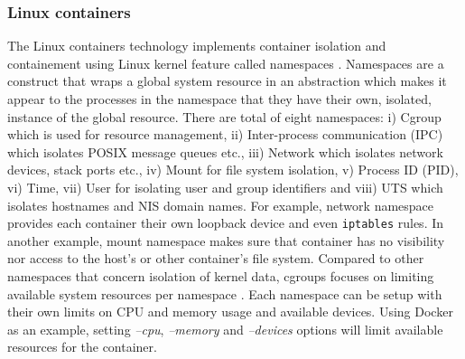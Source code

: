 \documentclass[english, 12pt, a4paper, sci, utf8, a-2b, online]{aaltothesis}
\begin{document}
\subsubsection{Linux containers}

The Linux containers technology implements container isolation and containement using Linux kernel feature called namespaces \cite{lin2018measurement}. Namespaces \cite{manpages-namespace} are a construct that wraps a global system resource in an abstraction which makes it appear to the processes in the namespace that they have their own, isolated, instance of the global resource. There are total of eight namespaces: i) Cgroup which is used for resource management, ii) Inter-process communication (IPC) which isolates POSIX message queues etc., iii) Network which isolates network devices, stack ports etc., iv) Mount for file system isolation, v) Process ID (PID), vi) Time, vii) User for isolating user and group identifiers and viii) UTS which isolates hostnames and NIS domain names. For example, network namespace provides each container their own loopback device and even \texttt{iptables} rules. In another example, mount namespace makes sure that container has no visibility nor access to the host's or other container's file system. Compared to other namespaces that concern isolation of kernel data, cgroups focuses on limiting available system resources per namespace \cite{lin2018measurement}. Each namespace can be setup with their own limits on CPU and memory usage and available devices. Using Docker as an example, setting \textit{--cpu}, \textit{--memory} and \textit{--devices} options will limit available resources for the container.

\end{document}
